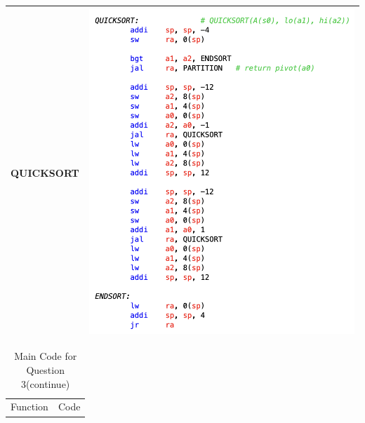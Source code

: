 \documentclass[10pt,a4paper]{article}
\begin{document}
\begin{ans}
\begin{table}[htbp]
\begin{center}
\begin{tabular}[H]{|M{3cm}|M{12cm}|}
					\hline
					QUICKSORT
					& \includegraphics[scale = 0.7]{Lab1-3-3.png}\\
					\hline
				\end{tabular}
		\end{center}
        
    \end{table}
	\begin{table}[htbp]
        \begin{center}
			\caption{Main Code for Question 3(continue)}
				\begin{tabular}[H]{|M{3cm}|M{12cm}|}
					\hline
					Function & Code\\


\end{tabular}
\end{center}
\end{table}
\end{ans}
\end{document}
